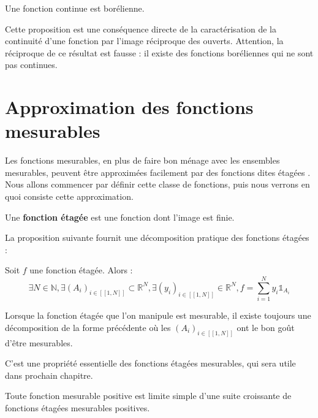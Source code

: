 \documentclass[../integ-proba.tex]{subfiles}
\begin{document}
\begin{prop}
  \label{prop:continue_implique_borelienne}
  Une fonction continue est borélienne.
\end{prop}

\begin{rem}
  Cette proposition est une conséquence directe de la caractérisation de la continuité d'une fonction par l'image réciproque des ouverts.
  Attention, la réciproque de ce résultat est fausse : il existe des fonctions boréliennes qui ne sont pas continues.
\end{rem}


\section{Approximation des fonctions mesurables}

Les fonctions mesurables, en plus de faire bon ménage avec les ensembles mesurables, peuvent être approximées facilement par des fonctions dites \og étagées \fg.
Nous allons commencer par définir cette classe de fonctions, puis nous verrons en quoi consiste cette approximation.

\begin{defi}
  Une \textbf{fonction étagée} est une fonction dont l'image est finie.
\end{defi}

La proposition suivante fournit une décomposition pratique des fonctions étagées :

\begin{prop}
  Soit $f$ une fonction étagée. Alors :
  $$
  \exists N \in \mathbb{N}, \exists \left(A_i\right)_{i \in [\![1,N]\!]} \subset \mathbb{R}^N, \exists \left(y_i\right)_{i \in [\![1,N]\!]} \in \mathbb{R}^N, f = \sum_{i=1}^{N}y_i\mathds{1}_{A_i}
  $$
\end{prop}

\begin{rem}
  Lorsque la fonction étagée que l'on manipule est mesurable, il existe toujours une décomposition de la forme précédente où les $\left(A_i\right)_{i\in[\![1,N]\!]}$ ont le bon goût d'être mesurables.

  C'est une propriété essentielle des fonctions étagées mesurables, qui sera utile dans prochain chapitre.
\end{rem}

\begin{thm}
  \label{thm:decompmes}
  Toute fonction mesurable positive est limite simple d'une suite croissante de fonctions étagées mesurables positives.
\end{thm}
\end{document}
